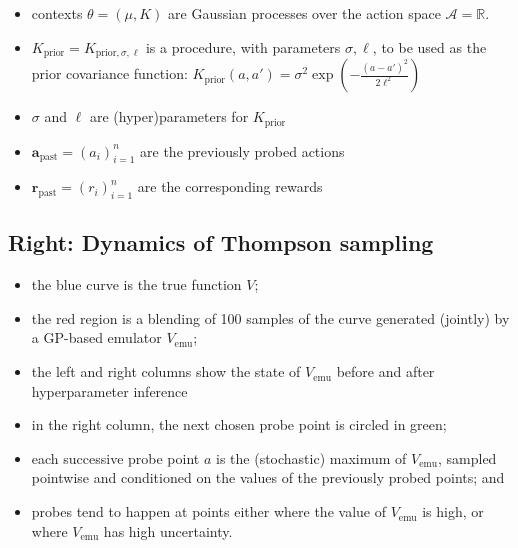 \documentclass[a0,portrait]{a0poster}
\newcommand{\emu}{{\textrm{emu}}}
\newcommand{\past}{{\textrm{past}}}
\newcommand{\prior}{{\textrm{prior}}}
\newcommand{\Acal}{\mathcal{A}}
\newcommand{\R}{\mathbb{R}}
\newcommand{\abf}{\mathbf{a}}
\newcommand{\rbf}{\mathbf{r}}
\newcommand{\pn}[1]{\left( #1 \right)}
\begin{document}
\begin{multicols}{2}
\begin{itemize}
\item contexts $\theta = (\mu, K)$ are Gaussian processes over the action space $\Acal = \R$.
  \item $K_\prior = K_{\prior,\sigma,\ell}$ is a procedure, with parameters $\sigma,\ell$, to be used as the prior covariance function: $K_\prior(a,a') = \sigma^2 \exp\pn{-\frac{(a-a')^2}{2\ell^2}}$
  \item $\sigma$ and $\ell$ are (hyper)parameters for $K_\prior$
  \item $\abf_\past = \pn{a_i}_{i=1}^{n}$ are the previously probed actions
  \item $\rbf_\past = \pn{r_i}_{i=1}^{n}$ are the corresponding rewards
\end{itemize}

\subsection*{Right: Dynamics of Thompson sampling}
\begin{itemize}
 \item the blue curve is the true function $V$;
 \item the red region is a blending of 100 samples of the curve generated (jointly) by a GP-based emulator $V_\emu$;
 \item  the left and right columns show the state of $V_\emu$ before and after hyperparameter inference
 \item in the right column, the next chosen probe point is circled in green;
 \item each successive probe point $a$ is the (stochastic) maximum of $V_\emu$, sampled pointwise and conditioned on the values of the previously probed points; and
 \item probes tend to happen at points either where the value of $V_\emu$ is high, or where $V_\emu$ has high uncertainty.
 
\end{itemize}

      
     
     
      
    
%

   




\end{multicols}
\end{document}

